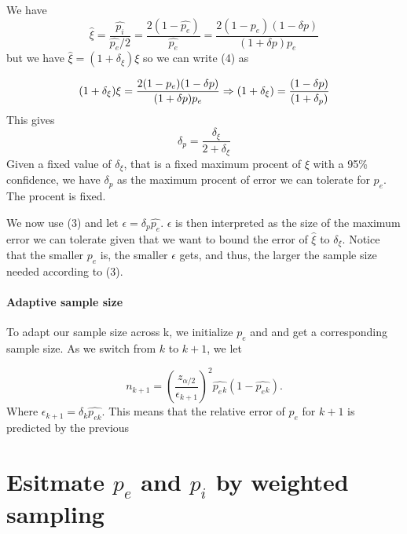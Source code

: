 \documentclass[a4paper,6pt]{article}
\begin{document}
We have
\begin{equation}
\hat{\xi} = \frac{\hat{p_i}}{\hat{p_e}/2} = \frac{2(1 -\hat{ p_e})}{\hat{p_e}} = \frac{2(1 - p_e)(1-\delta{p})}{(1+\delta{p})p_e}
\end{equation} 
but we have $\hat{\xi} = (1 + \delta_{\xi})\xi$ so we can write (4) as 

\begin{equation}
(1 + \delta_{\xi})\xi = \frac{2(1 - p_e)(1-\delta{p})}{(1+\delta{p})p_e} \Rightarrow \\
(1 + \delta_{\xi}) = \frac{(1-\delta{p})}{(1+\delta_{p})} 
\end{equation} 
This gives
\begin{equation}
\delta_{p} = \frac{\delta_{\xi}}{2+\delta_{\xi}} 
\end{equation} 
Given a fixed value of $\delta_{\xi}$, that is a fixed maximum procent of $\xi$ with a 95\% confidence, we have $\delta_{p}$ as the maximum procent of error we can tolerate for $p_e$. The procent is fixed.
 
We now use (3) and let $\epsilon =\delta_{p}\hat{p_e}$. $\epsilon$ is then interpreted as the size of the maximum error we can tolerate given that we want to bound the error of $\hat{\xi}$ to $\delta_{\xi}$. Notice that the smaller $p_e$ is, the smaller $\epsilon$ gets, and thus, the larger the sample size needed according to (3).

\paragraph{Adaptive sample size}
To adapt our sample size across k, we initialize $p_{e}$ and and get a corresponding sample size. As we switch from $k$ to $k+1$, we let 
 
\begin{equation}
n_{k+1} = (\frac{z_{\alpha/2}}{\epsilon_{k+1}})^2\hat{p_e{_k}}(1 - \hat{p_e{_k}}).
\end{equation} 
Where $\epsilon_{k+1} = \delta_k\hat{p_{ek}} $. This means that the relative error of $p_e$ for $k+1$ is predicted by the previous 
\section{Esitmate $p_e$ and $p_i$ by weighted sampling}
\end{document}
